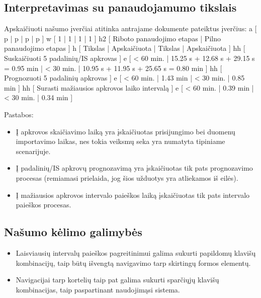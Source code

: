 \subsection{Interpretavimas su panaudojamumo tikslais}
Apskaičiuoti našumo įverčiai atitinka antrajame dokumente pateiktus įverčius:
\xtableu
{
  a  [ p | p | p | p ]
  w  [ 1 | 1 | 1 | 1 ]
  h2 [ Riboto panaudojimo etapas | Pilno panaudojimo etapas ]
  h  [ Tikslas | Apskaičiuota | Tikslas | Apskaičiuota ]
  hh [ Suskaičiuoti 5 padalinių/IS apkrovas ]
  e  [ < 60 min. | 15.25 s + 12.68 s + 29.15 s = 0.95 min 
     | < 30 min. | 10.95 s + 11.95 s + 25.65 s = 0.80 min ]
  hh [ Prognozuoti 5 padalinių apkrovas ]
  e  [ < 60 min. | 1.43 min 
     | < 30 min. | 0.85 min ]
  hh [ Surasti mažiausios apkrovos laiko intervalą ]
  e  [ < 60 min. | 0.39 min
     | < 30 min. | 0.34 min ]
}

Pastabos:
\begin{itemize}
  \item Į apkrovos skaičiavimo laiką yra įskaičiuotas prisijungimo bei duomenų importavimo laikas, nes tokia veiksmų seka yra numatyta tipiniame scenarijuje.
  \item Į padalinių/IS apkrovų prognozavimą yra įskaičiuotas tik pats prognozavimo procesas (remiamasi prielaida, jog šios užduotys yra atliekamos iš eilės).
  \item Į mažiausios apkrovos intervalo paieškos laiką įskaičiuotas tik pats intervalo paieškos procesas.
\end{itemize}

\subsection{Našumo kėlimo galimybės}
\begin{itemize}
  \item Laisviausių intervalų paieškos pagreitinimui galima sukurti papildomų klavišų kombinacijų, taip būtų išvengtą navigavimo tarp skirtingų formos elementų.
  \item Navigacijai tarp kortelių taip pat galima sukurti sparčiųjų klavišų kombinacijas, taip
  paspartinant naudojimąsi sistema.
\end{itemize}
  
